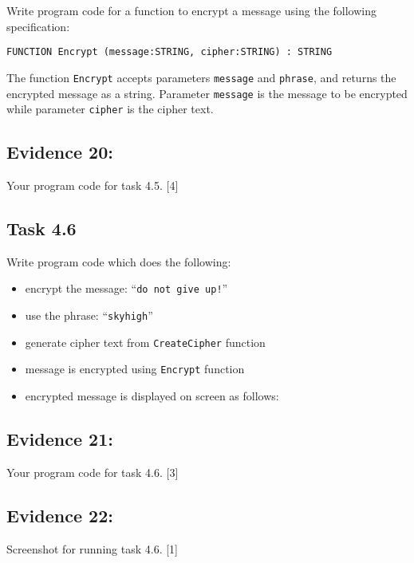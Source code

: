 Write program code for a function to encrypt a message using the following
specification:

\texttt{FUNCTION Encrypt (message:STRING, cipher:STRING) : STRING}

The function \texttt{Encrypt} accepts parameters \texttt{message}
and \texttt{phrase}, and returns the encrypted message as a string.
Parameter \texttt{message} is the message to be encrypted while parameter
\texttt{cipher} is the cipher text. 

\subsection*{Evidence 20: }

Your program code for task 4.5.\hfill{} {[}4{]}

\subsection*{Task 4.6 }

Write program code which does the following: 
\begin{itemize}
\item encrypt the message: \textquotedblleft \texttt{do not give up!}\textquotedblright{}
\item use the phrase: \textquotedblleft \texttt{skyhigh}\textquotedblright{} 
\item generate cipher text from \texttt{CreateCipher} function
\item message is encrypted using \texttt{Encrypt} function
\item encrypted message is displayed on screen as follows: 

\noindent{}
\end{itemize}

\subsection*{Evidence 21: }

Your program code for task 4.6. \hfill{}{[}3{]}

\subsection*{Evidence 22: }

Screenshot for running task 4.6. \hfill{}{[}1{]}